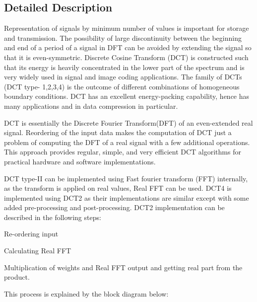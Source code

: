 \subsection{Detailed Description}
Representation of signals by minimum number of values is important for storage and transmission. The possibility of large discontinuity between the beginning and end of a period of a signal in D\-F\-T can be avoided by extending the signal so that it is even-\/symmetric. Discrete Cosine Transform (D\-C\-T) is constructed such that its energy is heavily concentrated in the lower part of the spectrum and is very widely used in signal and image coding applications. The family of D\-C\-Ts (D\-C\-T type-\/ 1,2,3,4) is the outcome of different combinations of homogeneous boundary conditions. D\-C\-T has an excellent energy-\/packing capability, hence has many applications and in data compression in particular.

D\-C\-T is essentially the Discrete Fourier Transform(\-D\-F\-T) of an even-\/extended real signal. Reordering of the input data makes the computation of D\-C\-T just a problem of computing the D\-F\-T of a real signal with a few additional operations. This approach provides regular, simple, and very efficient D\-C\-T algorithms for practical hardware and software implementations.

D\-C\-T type-\/\-I\-I can be implemented using Fast fourier transform (F\-F\-T) internally, as the transform is applied on real values, Real F\-F\-T can be used. D\-C\-T4 is implemented using D\-C\-T2 as their implementations are similar except with some added pre-\/processing and post-\/processing. D\-C\-T2 implementation can be described in the following steps\-:
\begin{DoxyItemize}
\item Re-\/ordering input
\item Calculating Real F\-F\-T
\item Multiplication of weights and Real F\-F\-T output and getting real part from the product.
\end{DoxyItemize}

This process is explained by the block diagram below\-: 

